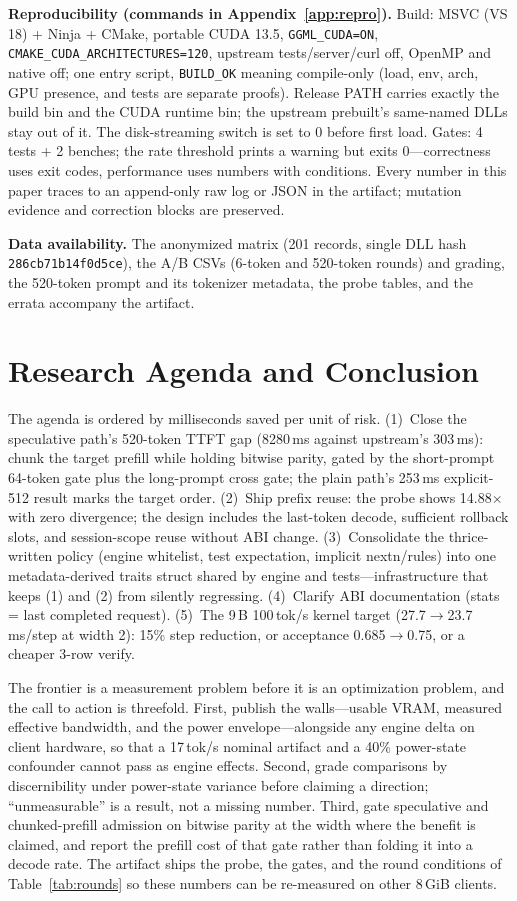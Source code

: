 \documentclass[letterpaper,twocolumn,10pt]{article}
\begin{document}
\textbf{Reproducibility (commands in Appendix~\ref{app:repro}).} Build: MSVC
(VS 18) + Ninja + CMake, portable CUDA 13.5, \texttt{GGML\_CUDA=ON},
\texttt{CMAKE\_CUDA\_ARCHITECTURES=120}, upstream tests/server/curl off, OpenMP
and native off; one entry script, \texttt{BUILD\_OK} meaning compile-only
(load, env, arch, GPU presence, and tests are separate proofs). Release PATH
carries exactly the build bin and the CUDA runtime bin; the upstream
prebuilt's same-named DLLs stay out of it. The disk-streaming switch is set to
0 before first load. Gates: 4 tests + 2 benches; the rate threshold prints a
warning but exits 0---correctness uses exit codes, performance uses numbers
with conditions. Every number in this paper traces to an append-only raw log
or JSON in the artifact; mutation evidence and correction blocks are
preserved.

\textbf{Data availability.} The anonymized matrix (201 records, single DLL hash
\texttt{286cb71b14f0d5ce}), the A/B CSVs (6-token and 520-token rounds) and
grading, the 520-token prompt and its tokenizer metadata, the probe tables, and
the errata accompany the artifact.

\section{Research Agenda and Conclusion}

The agenda is ordered by milliseconds saved per unit of risk. (1)~Close the
speculative path's 520-token TTFT gap (8280\,ms against upstream's 303\,ms):
chunk the target prefill while holding bitwise parity, gated by the
short-prompt 64-token gate plus the long-prompt cross gate; the plain path's
253\,ms explicit-512 result marks the target order. (2)~Ship prefix
reuse: the probe shows 14.88$\times$ with zero divergence; the design includes
the last-token decode, sufficient rollback slots, and session-scope reuse
without ABI change. (3)~Consolidate the thrice-written policy (engine
whitelist, test expectation, implicit nextn/rules) into one metadata-derived
traits struct shared by engine and tests---infrastructure that keeps (1) and
(2) from silently regressing. (4)~Clarify ABI documentation (stats = last
completed request). (5)~The 9\,B 100\,tok/s kernel target
(27.7$\rightarrow$23.7\,ms/step at width 2): 15\% step reduction, or acceptance
0.685$\rightarrow$0.75, or a cheaper 3-row verify.

The frontier is a measurement problem before it is an optimization problem,
and the call to action is threefold. First, publish the walls---usable VRAM,
measured effective bandwidth, and the power envelope---alongside any engine
delta on client hardware, so that a 17\,tok/s nominal artifact and a 40\%
power-state confounder cannot pass as engine effects. Second, grade comparisons
by discernibility under power-state variance before claiming a direction;
``unmeasurable'' is a result, not a missing number. Third, gate speculative and
chunked-prefill admission on bitwise parity at the width where the benefit is
claimed, and report the prefill cost of that gate rather than folding it into a
decode rate. The artifact ships the probe, the gates, and the round conditions
of Table~\ref{tab:rounds} so these numbers can be re-measured on other 8\,GiB
clients.
\end{document}
